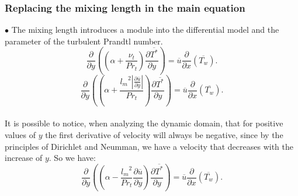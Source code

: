 \documentclass[xcolor=dvipsnames,8pt,aspectratio=34]{beamer}
\begin{document}
		\begin{frame}
			\frametitle{Replacing the mixing length in the main equation}	
			$\bullet$ 
			The mixing length introduces a module into the differential model and the parameter of the turbulent Prandtl number.
			\\
				\begin{equation}
				{\frac{\partial{}}{\partial{y}}} \left( \left( \alpha   
				+ \frac{\nu_t}{Pr_t} \right) \frac{\partial \overline{T^\ast}}{\partial y} \right)
				= 
				\overline{u}\frac{\partial{}}{\partial{x}}\left(\overline{T_w}\right)  .
				\end{equation}
			\begin{equation}
			{\frac{\partial{}}{\partial{y}}} \left( \left( \alpha   
			+ \frac{{l_m}^2 \left| \frac{\partial \overline{u}}{\partial y} \right|}{Pr_t} \right) \frac{\partial \overline{T^\ast}}{\partial y} \right)
			= 
			\overline{u}\frac{\partial{}}{\partial{x}}\left(\overline{T_w}\right)  .
			\end{equation}
		\\
		
		It is possible to notice, when analyzing the dynamic domain, that for positive values of $ y $ the first derivative of velocity will always be negative, since by the principles of Dirichlet and Neumman, we have a velocity that decreases with the increase of $ y $. So we have: \\
			\begin{equation}
			{\frac{\partial{}}{\partial{y}}} \left( \left( \alpha   
			- \frac{{l_m}^2}{Pr_t}\frac{\partial \overline{u}}{\partial y} \right) \frac{\partial \overline{T^\ast}}{\partial y} \right)
			= 
			\overline{u}\frac{\partial{}}{\partial{x}}\left(\overline{T_w}\right)  .
			\end{equation}
		\end{frame}	
	
	
	
\end{document}
